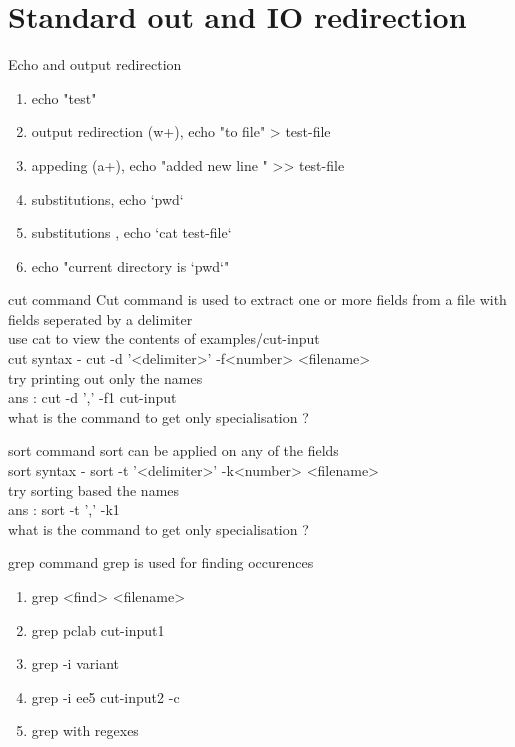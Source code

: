 \documentclass{beamer}
\begin{document}
\section{Standard out and IO redirection}
{
	\selectfont
\begin{frame}{Echo and output redirection}
	\begin{enumerate}
		\item<1-> echo "test"
		\item<2-> output redirection (w+), echo "to file" > test-file
		\item<3-> appeding (a+), echo "added new line " >> test-file
		\item<4-> substitutions, echo `pwd`
			\item<5-> substitutions , echo `cat test-file`
		\item<5-> echo "current directory is `pwd`"
	\end{enumerate}
\end{frame}
\begin{frame}{cut command}
	Cut command is used to extract one or more fields from a file with fields seperated by a delimiter\\
	use cat  to view the contents of examples/cut-input\\ \pause
	cut syntax - cut -d '<delimiter>' -f<number> <filename>\\
	try printing out only the names\\ \pause
	ans : cut -d ',' -f1 cut-input\\
	what is the command to get only specialisation ? \pause


\end{frame}
\begin{frame}{sort command}
	sort can be applied on any of the fields\\ \pause 
	sort syntax - sort -t '<delimiter>' -k<number> <filename>\\
	try sorting based the names\\ \pause
	ans : sort -t ',' -k1\\
	what is the command to get only specialisation ? \pause


\end{frame}
\begin{frame}{grep command}
	grep is used for finding occurences\\ 
	\begin{enumerate}
		\item<2-> grep <find> <filename>
		\item<2-> grep pclab cut-input1
		\item<3-> grep -i variant 
		\item<4-> grep -i ee5 cut-input2 -c 
		\item<5-> grep with regexes 
	\end{enumerate}



\end{frame}}
\end{document}
